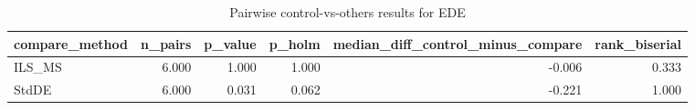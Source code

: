 \begin{table}[!t]
\centering
\caption{Pairwise control-vs-others results for EDE}
\label{tab:posthoc_holm_generated}
\begin{tabular}{lrrrrr}
\toprule
compare_method & n_pairs & p_value & p_holm & median_diff_control_minus_compare & rank_biserial \\
\midrule
ILS_MS & 6.000 & 1.000 & 1.000 & -0.006 & 0.333 \\
StdDE & 6.000 & 0.031 & 0.062 & -0.221 & 1.000 \\
\bottomrule
\end{tabular}

\end{table}